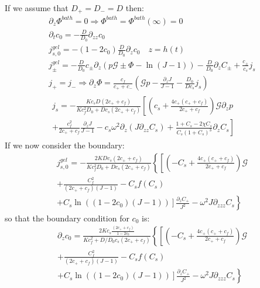 \documentclass[12pt]{extarticle}
\begin{document}
If we assume that $D_+=D_-=D$ then:
\begin{gather}
\partial_z \Phi^{bath}=0 \Rightarrow \Phi^{bath}=\Phi^{bath}(\infty)=0\\
\partial_t c_0 = -\frac{D}{D_0} \partial_{zz}c_0\\
j_{s,0}^{gel}=-(1-2c_0)\frac{D}{D_0} \partial_z c_0 \quad z=h(t)\\
j_{\pm}^{gel}=-\frac{D}{D_0}c_\pm \partial_z\left(p\mathcal{G}\pm\Phi-\ln(J-1)\right)-\frac{D}{D_0}\partial_z C_\pm+\frac{c_\pm}{c_s}j_s\\ 
j_+=j_- \Rightarrow  \partial_z \Phi = \frac{c_f}{c_++c_-} \left(\mathcal{G}p-\frac{\partial_z J}{J-1}-\frac{D_0}{Dc_s}j_s\right)\\
\begin{aligned}
j_s = - \frac{Kc_s D(2c_++c_f)}{Kc_f^2D_0+Dc_s(2c_++c_f)}\left[\left(c_s+\frac{4c_+(c_++c_f)}{2c_++c_f}\right)\mathcal{G}\partial_z p\right.\\
\left.+\frac{c_f^2}{2c_++c_f}\frac{\partial_z J}{J-1}-c_s \omega^2 \partial_z(J\partial_{zz}C_s)+\frac{1+C_s-2\chi C_s}{C_s(1+C_s)^3}\partial_z C_s\right]
\end{aligned}
\end{gather}
If we now consider the boundary:
\begin{equation}
\begin{aligned}
j^{gel}_{s,0} = - \frac{2K Dc_s(2c_++c_f)}{Kc_f^2D_0+Dc_s(2c_++c_f)}\left\{\left[\left(-C_s+\frac{4c_+(c_++c_f)}{2c_++c_f}\right)\mathcal{G}\right.\right.\\
\left.\left.+\frac{C_f^2}{(2c_++c_f)(J-1)}-C_sf(C_s)\right.\right.\\
\left.\left.+C_s\ln\left((1-2c_0)(J-1)\right)\right]\frac{\partial_z C_+}{J^2}-\omega^2J\partial_{zzz}C_s\right\}
\end{aligned}
\end{equation}
so that the boundary condition for $c_0$ is:
\begin{equation}
\begin{aligned}
\partial_z c_0= \frac{2K c_s\frac{(2c_++c_f)}{1-2c_0}}{Kc_f^2+D/D_0c_s(2c_++c_f)}\left\{\left[\left(-C_s+\frac{4c_+(c_++c_f)}{2c_++c_f}\right)\mathcal{G}\right.\right.\\
\left.\left.+\frac{C_f^2}{(2c_++c_f)(J-1)}-C_sf(C_s)\right.\right.\\
\left.\left.+C_s\ln\left((1-2c_0)(J-1)\right)\right]\frac{\partial_z C_+}{J^2}-\omega^2J\partial_{zzz}C_s\right\}
\end{aligned}
\end{equation}
\end{document}

